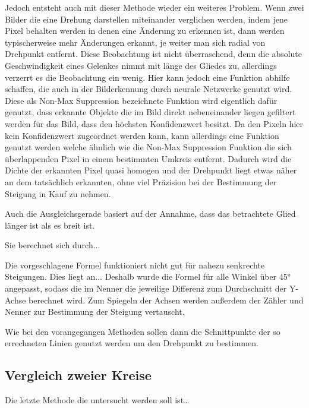 Jedoch entsteht auch mit dieser Methode wieder ein weiteres Problem.
Wenn zwei Bilder die eine Drehung darstellen miteinander verglichen werden, indem jene Pixel behalten werden in denen eine Änderung zu erkennen ist, dann werden typischerweise mehr Änderungen erkannt, je weiter man sich radial von Drehpunkt entfernt.
Diese Beobachtung ist nicht überraschend, denn die absolute Geschwindigkeit eines Gelenkes nimmt mit länge des Gliedes zu, allerdings verzerrt es die Beobachtung ein wenig.
Hier kann jedoch eine Funktion abhilfe schaffen, die auch in der Bilderkennung durch neurale Netzwerke genutzt wird.
Diese als Non-Max Suppression %
bezeichnete Funktion wird eigentlich dafür genutzt, dass erkannte Objekte die im Bild direkt nebeneinander liegen gefiltert werden für das Bild, dass den höchsten Konfidenzwert besitzt.
Da den Pixeln hier kein Konfidenzwert zugeordnet werden kann, kann allerdings eine Funktion genutzt werden welche ähnlich wie die Non-Max Suppression Funktion %
die sich überlappenden Pixel in einem bestimmten Umkreis entfernt.
Dadurch wird die Dichte der erkannten Pixel quasi homogen und der Drehpunkt liegt etwas näher an dem tatsächlich erkannten, ohne viel Präzision bei der Bestimmung der Steigung in Kauf zu nehmen.



Auch die Ausgleichsgerade basiert auf der Annahme, dass das betrachtete Glied länger ist als es breit ist.

Sie berechnet sich durch... %

Die vorgeschlagene Formel funktioniert nicht gut für nahezu senkrechte Steigungen.
Dies liegt an... %
Deshalb wurde die Formel für alle Winkel über 45° angepasst, sodass die im Nenner die jeweilige Differenz zum Durchschnitt der Y-Achse berechnet wird.
Zum Spiegeln der Achsen werden außerdem der Zähler und Nenner zur Bestimmung der Steigung vertauscht.


Wie bei den vorangegangen Methoden sollen dann die Schnittpunkte der so errechneten Linien genutzt werden um den Drehpunkt zu bestimmen.

\subsection{Vergleich zweier Kreise}

Die letzte Methode die untersucht werden soll ist\dots


